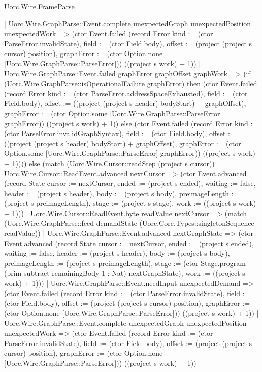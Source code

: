 \begin{lexlean}{Uorc.Wire.FrameParse}
\begin{semanticmodule}
{        | Uorc.Wire.GraphParse::Event.complete unexpectedGraph unexpectedPosition unexpectedWork => (ctor Event.failed (record Error {kind := (ctor ParseError.invalidState), field := (ctor Field.body), offset := (project (project s cursor) position), graphError := (ctor Option.none [Uorc.Wire.GraphParse::ParseError])}) ((project s work) + 1))
        | Uorc.Wire.GraphParse::Event.failed graphError graphOffset graphWork => (if (Uorc.Wire.GraphParse::isOperationalFailure graphError) then (ctor Event.failed (record Error {kind := (ctor ParseError.addressSpaceExhausted), field := (ctor Field.body), offset := ((project (project s header) bodyStart) + graphOffset), graphError := (ctor Option.some [Uorc.Wire.GraphParse::ParseError] graphError)}) ((project s work) + 1)) else (ctor Event.failed (record Error {kind := (ctor ParseError.invalidGraphSyntax), field := (ctor Field.body), offset := ((project (project s header) bodyStart) + graphOffset), graphError := (ctor Option.some [Uorc.Wire.GraphParse::ParseError] graphError)}) ((project s work) + 1)))) else (match (Uorc.Wire.Cursor::readStep (project s cursor))
        | Uorc.Wire.Cursor::ReadEvent.advanced nextCursor => (ctor Event.advanced (record State {cursor := nextCursor, ended := (project s ended), waiting := false, header := (project s header), body := (project s body), preimageLength := (project s preimageLength), stage := (project s stage), work := ((project s work) + 1)}))
        | Uorc.Wire.Cursor::ReadEvent.byte readValue nextCursor => (match (Uorc.Wire.GraphParse::feed demandState (Uorc.Core.Types::singletonSequence readValue))
          | Uorc.Wire.GraphParse::Event.advanced nextGraphState => (ctor Event.advanced (record State {cursor := nextCursor, ended := (project s ended), waiting := false, header := (project s header), body := (project s body), preimageLength := (project s preimageLength), stage := (ctor Stage.program (prim subtract remainingBody 1 : Nat) nextGraphState), work := ((project s work) + 1)}))
          | Uorc.Wire.GraphParse::Event.needInput unexpectedDemand => (ctor Event.failed (record Error {kind := (ctor ParseError.invalidState), field := (ctor Field.body), offset := (project (project s cursor) position), graphError := (ctor Option.none [Uorc.Wire.GraphParse::ParseError])}) ((project s work) + 1))
          | Uorc.Wire.GraphParse::Event.complete unexpectedGraph unexpectedPosition unexpectedWork => (ctor Event.failed (record Error {kind := (ctor ParseError.invalidState), field := (ctor Field.body), offset := (project (project s cursor) position), graphError := (ctor Option.none [Uorc.Wire.GraphParse::ParseError])}) ((project s work) + 1))
}
\end{semanticmodule}
\end{lexlean}
